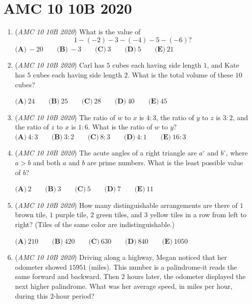 \section{AMC 10 10B 2020}
        \begin{enumerate}
        	\item (\textit{AMC 10 10B 2020}) What is the value of 
 \[1 - (-2) - 3 - (-4) - 5 - (-6)?\]
$\textbf{(A)}\ -20 \qquad\textbf{(B)}\ -3 \qquad\textbf{(C)}\ 3 \qquad\textbf{(D)}\ 5 \qquad\textbf{(E)}\ 21$


	\item (\textit{AMC 10 10B 2020}) Carl has $5$ cubes each having side length $1$, and Kate has $5$ cubes each having side length $2$. What is the total volume of these $10$ cubes?


 $\textbf{(A)}\ 24 \qquad\textbf{(B)}\ 25 \qquad\textbf{(C)}\ 28 \qquad\textbf{(D)}\ 40 \qquad\textbf{(E)}\ 45$


	\item (\textit{AMC 10 10B 2020}) The ratio of $w$ to $x$ is $4:3$, the ratio of $y$ to $z$ is $3:2$, and the ratio of $z$ to $x$ is $1:6$. What is the ratio of $w$ to $y?$
$\textbf{(A)}\ 4:3 \qquad\textbf{(B)}\ 3:2 \qquad\textbf{(C)}\  8:3 \qquad\textbf{(D)}\ 4:1 \qquad\textbf{(E)}\ 16:3$


	\item (\textit{AMC 10 10B 2020}) The acute angles of a right triangle are $a^{\circ}$ and $b^{\circ}$, where $a>b$ and both $a$ and $b$ are prime numbers. What is the least possible value of $b$?


 $\textbf{(A)}\ 2 \qquad\textbf{(B)}\ 3 \qquad\textbf{(C)}\  5 \qquad\textbf{(D)}\ 7 \qquad\textbf{(E)}\ 11$


	\item (\textit{AMC 10 10B 2020}) How many distinguishable arrangements are there of $1$ brown tile, $1$ purple tile, $2$ green tiles, and $3$ yellow tiles in a row from left to right? (Tiles of the same color are indistinguishable.)


 $\textbf{(A)}\ 210 \qquad\textbf{(B)}\ 420 \qquad\textbf{(C)}\  630 \qquad\textbf{(D)}\ 840 \qquad\textbf{(E)}\ 1050$


	\item (\textit{AMC 10 10B 2020}) Driving along a highway, Megan noticed that her odometer showed $15951$ (miles). This number is a palindrome-it reads the same forward and backward. Then $2$ hours later, the odometer displayed the next higher palindrome. What was her average speed, in miles per hour, during this $2$-hour period?



\end{enumerate}
